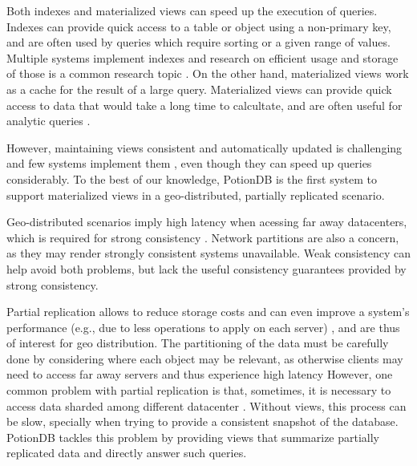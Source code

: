 \documentclass{vldb}
\newcommand{\grumbler}[2]{{\color{red}{\bf #1:} #2}}
\renewcommand{\grumbler}[2]{}
\newcommand{\andre}[1]{\grumbler{andre}{#1}}
\begin{document}
Both indexes and materialized views can speed up the execution of queries.
Indexes can provide quick access to a table or object using a non-primary key, and are often used by queries which require sorting or a given range of values.
Multiple systems implement indexes \cite{dynamo, couchDB, cassandra, megastore} and research on efficient usage and storage of those is a common research topic \cite{lee2020asymmetric, lisa, alex, bindex, slik}.
On the other hand, materialized views work as a cache for the result of a large query.
Materialized views can provide quick access to data that would take a long time to calcultate, and are often useful for analytic queries \cite{analyticdb}.
\andre{[I didn't find a proper reference for ``views being useful for analytic queries''. Suggestions?]}
However, maintaining views consistent and automatically updated is challenging \cite{oracleViews, chronocache, birds} and few systems implement them \cite{chronocache, marviq, estocada, couchDB, oracleViews, noria}, even though they can speed up queries considerably.
To the best of our knowledge, PotionDB is the first system to support materialized views in a geo-distributed, partially replicated scenario.

Geo-distributed scenarios imply high latency when acessing far away datacenters, which is required for strong consistency \cite{chronocache, slog, cops, lloyd2013stronger}. 
Network partitions are also a concern, as they may render strongly consistent systems unavailable.
Weak consistency can help avoid both problems, but lack the useful consistency guarantees provided by strong consistency.

\andre{I still need to find citations for partial replication. Any suggestion/starting point is more than welcome}

Partial replication allows to reduce storage costs and can even improve a system's performance (e.g., due to less operations to apply on each server) \cite{spire, optimisticPartial, coda}, and are thus of interest for geo distribution.
The partitioning of the data must be carefully done by considering where each object may be relevant, as otherwise clients may need to access far away servers and thus experience high latency \cite{spire, optimisticPartial, coda}
However, one common problem with partial replication is that, sometimes, it is necessary to access data sharded among different datacenter \cite{spire}.
Without views, this process can be slow, specially when trying to provide a consistent snapshot of the database.
PotionDB tackles this problem by providing views that summarize partially replicated data and directly answer such queries.
\end{document}
